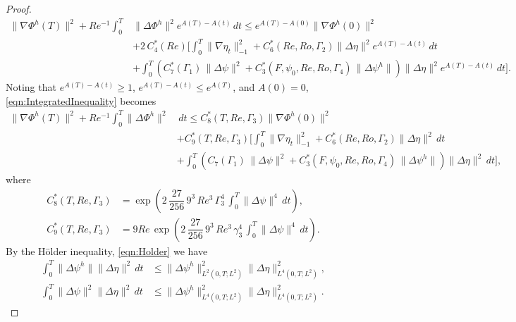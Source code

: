 \begin{proof}
\begin{equation}
    \begin{split}
      \|\nabla \Phi^h(T)\|^2 + Re^{-1} \int_0^T\! &\|\Delta \Phi^h\|^2
        e^{A(T) - A(t)}\, dt \le e^{A(T) - A(0)} \|\nabla \Phi^h(0)\|^2 \\
      & + 2\, C^*_4(Re)\biggl[ \int_0^T\! \|\nabla \eta_t\|_{-1}^2
        + C^*_6(Re,Ro,\Gamma_2) \|\Delta \eta\|^2 e^{A(T) - A(t)}\, dt \\
      & + \int_0^T\!  \left( C^*_7(\Gamma_1)\, \|\Delta \psi\|^2
        +  C^*_3(F,\psi_0,Re,Ro,\Gamma_4)\,\|\Delta \psi^h\|\right)
        \|\Delta \eta\|^2 e^{A(T) - A(t)}\, dt\biggr].
    \end{split}
    \label{eqn:IntegratedInequality}
  \end{equation}
  Noting that $e^{A(T) - A(t)} \ge 1$, $e^{A(T) - A(t)} \le e^{A(T)}$, and
  $A(0) = 0$, \eqref{eqn:IntegratedInequality} becomes
  \begin{equation}
    \begin{split}
      \|\nabla \Phi^h(T)\|^2 + Re^{-1} \int_0^T\! \|\Delta \Phi^h\|^2 &\, dt
        \le C^*_8(T,Re,\Gamma_3) \|\nabla \Phi^h(0)\|^2 \\
      & + C^*_9(T,Re,\Gamma_3)\biggl[ \int_0^T\! \|\nabla \eta_t\|_{-1}^2
        + C^*_6(Re,Ro,\Gamma_2) \|\Delta \eta\|^2\, dt \\
      & + \int_0^T\!  \left( C_7(\Gamma_1)\, \|\Delta \psi\|^2
        + C^*_3(F,\psi_0,Re,Ro,\Gamma_4)\,\|\Delta \psi^h\|\right)
        \|\Delta \eta\|^2\, dt\biggr],
    \end{split} \label{eqn:CTREInequality}
  \end{equation}
  where
  \begin{align}
    C^*_8(T,Re,\Gamma_3) &= \exp\!\left(2\,\dfrac{27}{256}\, 9^3\, Re^3\,
      \Gamma_3^4\, \int_{0}^{T}\!\|\Delta \psi\|^4\, dt\right), \label{eqn:C1TRe} \\
    C^*_9(T,Re,\Gamma_3) &= 9 Re\, \exp\!\left(2\,\dfrac{27}{256}\, 9^3\, Re^3\,
      \gamma_3^4\, \int_{0}^{T}\!\|\Delta \psi\|^4\, dt\right). \label{eqn:C2TRe}
  \end{align}
  By the H\"older inequality, \eqref{eqn:Holder} we have
  \begin{align}
    \int_0^T\! \|\Delta \psi^h\| \|\Delta \eta\|^2\, dt &\le
      \|\Delta \psi^h\|^2_{L^2(0,T;L^2)} \|\Delta \eta\|^2_{L^4(0,T;L^2)},
    \label{eqn:HolderPsih} \\
    \int_0^T\! \|\Delta \psi\|^2 \|\Delta \eta\|^2\, dt &\le
      \|\Delta \psi^h\|^2_{L^4(0,T;L^2)} \|\Delta \eta\|^2_{L^4(0,T;L^2)}.

\end{align}
\end{proof}
